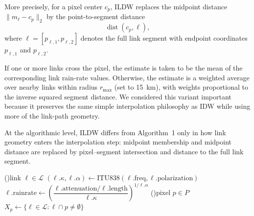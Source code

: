 \documentclass[11pt]{article}
\begin{document}
More precisely, for a pixel center $c_p$, ILDW replaces the midpoint distance $\|m_\ell-c_p\|_2$ by the point-to-segment distance
\[
\operatorname{dist}(c_p,\ell),
\]
where $\ell=[p_{\ell,1},p_{\ell,2}]$ denotes the full link segment with endpoint coordinates $p_{\ell,1}$ and $p_{\ell,2}$.


If one or more links cross the pixel, the estimate is taken to be the mean of the corresponding link rain-rate values. Otherwise, the estimate is a weighted average over nearby links within radius $r_{\max}$ (set to \SI{15}{km}), with weights proportional to the inverse squared segment distance. We considered this variant important because it preserves the same simple interpolation philosophy as IDW while using more of the link-path geometry.

At the algorithmic level, ILDW differs from Algorithm~1 only in how link geometry enters the interpolation step: midpoint membership and midpoint distance are replaced by pixel--segment intersection and distance to the full link segment.

\begin{algorithm}[H]
    \caption{Discretized ILDW. Link influence is determined using pixel--segment intersection and point-to-segment distance.}
    \DontPrintSemicolon
\ForEach(){link $\ell \in \mathcal{L}$}{%
    $(\ell.\kappa,\ell.\alpha) \gets \mathrm{ITU838}(\ell.\mathrm{freq},\ell.\mathrm{polarization})$\;
    $\ell.\mathrm{rainrate} \gets \left(\dfrac{\ell.\mathrm{attenuation}/\ell.\mathrm{length}}{\ell.\kappa}\right)^{1/\ell.\alpha}$\;
}
   \ForEach(){pixel $p \in {P}$}{
        $X_p \gets \{\ell \in \mathcal{L} : \ell\cap p \neq \emptyset\}$\;
    }
\end{algorithm}
\end{document}
